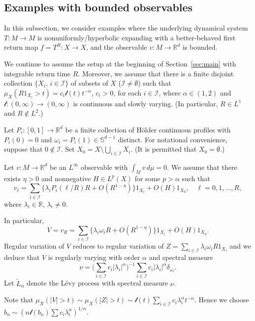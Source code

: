 \documentclass[12pt]{article}
\numberwithin{equation}{section}
\newcommand{\R}{{\mathbb R}}
\newcommand{\bbS}{{\mathbb S}}
\newcommand{\cI}{{\mathcal I}}
\newcommand{\tL}{{\tilde L}}
\begin{document}
\subsection{Examples with bounded observables}
\label{sec:Young}

In this subsection, we consider examples where the underlying dynamical system 
$T:M\to M$ is nonuniformly/hyperbolic expanding with a better-behaved first return map $f=T^R:X\to X$, and the observable $v:M\to\R^d$ is bounded.

We continue to assume the setup at the beginning of Section~\ref{sec:main}
with integrable return time $R$.
Moreover, we assume that there is a finite disjoint collection $\{X_i,\,i\in\cI\}$ of subsets of $X$ ($\cI\neq\emptyset$) such that
$\mu_X(R1_{X_i}>t)=c_i\mathcal{l}(t)t^{-\alpha}$, $c_i>0$, for each $i\in\cI$,
where $\alpha\in(1,2)$ and $\mathcal{l}:(0,\infty)\to(0,\infty)$ is continuous and slowly varying.
(In particular, $R\in L^1$ and $R\not\in L^2$.) 

Let $P_i:[0,1]\to\R^d$ be a finite collection of H\"older continuous profiles with
$P_i(0)=0$ and
$\omega_i=P_i(1)\in\bbS^{d-1}$ distinct.
For notational convenience, suppose that $0\not\in\cI$.
Set $X_0=X\setminus\bigcup_{i\in\cI}X_i$.
(It is permitted that $X_0=\emptyset$.) 

Let $v:M\to\R^d$ be an $L^\infty$ observable with $\int_M v\,d\mu=0$.
We assume that there exists $\eta>0$ and 
nonnegative $H\in L^p(X)$ for some $p>\alpha$ such that
\begin{equation} \label{eq:vl}
v_\ell=\sum_{i\in\cI}\{\lambda_i P_i(\ell/R)R +O(R^{1-\eta})\} 1_{X_i} +O(H) 1_{X_0} ,\quad \ell=0,1,\dots,R,
\end{equation}
where $\lambda_i\in\R$, $\lambda_i\neq0$. 

In particular, 
\[
V=v_R =\sum_{i\in\cI}\{\lambda_i \omega_i R +O(R^{1-\eta})\} 1_{X_i} +O(H)1_{X_0}.
\]
Regular variation of $V$ reduces to regular variation of
$Z=\sum_{i\in\cI}\lambda_i \omega_i R 1_{X_i}$ and we deduce that
$V$ is regularly varying with order $\alpha$ and spectral measure
\begin{equation} \label{eq:nu}
\nu=\Big(\sum_{i\in\cI} c_i |\lambda_i|^\alpha\Big)^{-1}\sum_{i\in\cI} c_i |\lambda_i|^\alpha \delta_{\omega_i}.
\end{equation} 
Let $\tL_\alpha$ denote the L\'evy process with spectral measure $\nu$.

Note that $\mu_X(|V|>t)\sim \mu_X(|Z|>t)\sim \mathcal{l}(t)\sum_{i\in\cI}c_i\lambda_i^\alpha t^{-\alpha}$. 
Hence we
choose $b_n\sim (n\mathcal{l}(b_n)\sum c_i\lambda_i^\alpha)^{1/\alpha}$.
\end{document}
